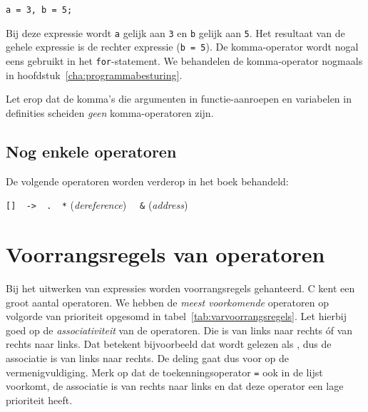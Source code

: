 \hspace*{1em}\texttt{a = 3, b = 5;}

Bij deze expressie wordt \texttt{a} gelijk aan \texttt{3} en \texttt{b} gelijk aan \texttt{5}. Het resultaat van de gehele expressie is de rechter expressie (\texttt{b = 5}). De komma-operator wordt nogal eens gebruikt in het \texttt{for}-statement. We behandelen de komma-operator nogmaals in hoofdstuk~\ref{cha:programmabesturing}.

Let erop dat de komma's die argumenten in functie-aanroepen en variabelen in definities scheiden \textsl{geen} komma-operatoren zijn.

\subsection{Nog enkele operatoren}
De volgende operatoren worden verderop in het boek behandeld:

\hspace*{1cm}\texttt{[]\ \ ->\ \ .\ \ *} (\textsl{dereference}) \texttt{\ \ \&} (\textsl{address})

\section{Voorrangsregels van operatoren}
Bij het uitwerken van expressies worden voorrangsregels gehanteerd. C kent een groot aantal operatoren. We hebben de \textsl{meest voorkomende} operatoren op volgorde van prioriteit opgesomd in tabel~\ref{tab:varvoorrangsregels}. Let hierbij goed op de \textsl{associativiteit} van de operatoren. Die is van links naar rechts óf van rechts naar links. Dat betekent bijvoorbeeld dat  wordt gelezen als  , dus de associatie is van links naar rechts. De deling gaat dus voor op de vermenigvuldiging. Merk op dat de toekenningsoperator \texttt{=} ook in de lijst voorkomt, de associatie is van rechts naar links en dat deze operator een lage prioriteit heeft.

